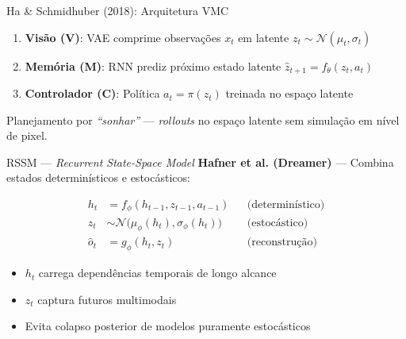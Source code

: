 \documentclass[aspectratio=169]{beamer}
\begin{document}
\begin{frame}{Ha \& Schmidhuber (2018): Arquitetura VMC}
  \begin{center}
  \end{center}

  \begin{enumerate}
    \item \textbf{Visão (V)}: VAE comprime observações $x_t$ em latente $z_t \sim \mathcal{N}(\mu_t, \sigma_t)$
    \item \textbf{Memória (M)}: RNN prediz próximo estado latente $\hat{z}_{t+1} = f_\theta(z_t, a_t)$
    \item \textbf{Controlador (C)}: Política $a_t = \pi(z_t)$ treinada no espaço latente
  \end{enumerate}

  \vspace{0.1em}
  Planejamento por \textit{``sonhar''} --- \textit{rollouts} no espaço latente sem simulação em nível de pixel.
\end{frame}

\begin{frame}{RSSM --- \textit{Recurrent State-Space Model}}
  \textbf{Hafner et al. (Dreamer)} --- Combina estados determinísticos e estocásticos:

  \vspace{0.3em}
  \begin{align}
    h_t &= f_\phi(h_{t-1}, z_{t-1}, a_{t-1}) &&\text{(determinístico)} \\
    z_t &\sim \mathcal{N}\bigl(\mu_\phi(h_t), \sigma_\phi(h_t)\bigr) &&\text{(estocástico)} \\
    \hat{o}_t &= g_\phi(h_t, z_t) &&\text{(reconstrução)}
  \end{align}

  \vspace{0.3em}
  \begin{itemize}
    \item $h_t$ carrega dependências temporais de longo alcance
    \item $z_t$ captura futuros multimodais
    \item Evita colapso posterior de modelos puramente estocásticos
  \end{itemize}
\end{frame}
\end{document}
